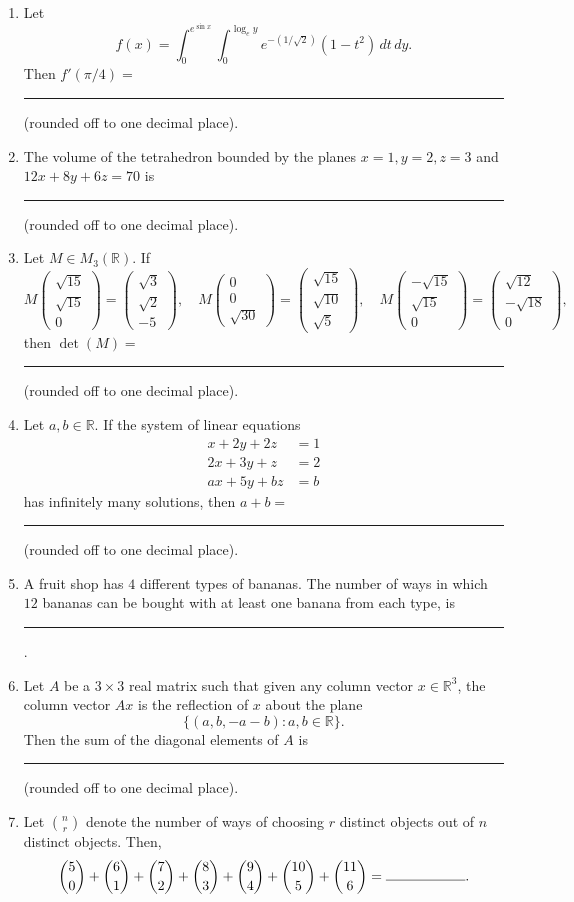 \begin{enumerate}
\item Let
\[f(x)=\int_0^{e^{\sin x}}\int_0^{\log_e y} e^{-(1/\sqrt2)}(1-t^2)\,dt\,dy.\]
Then $f'(\pi/4)=$ \rule{2cm}{0.4pt} (rounded off to one decimal place).
\item The volume of the tetrahedron bounded by the planes $x=1,y=2,z=3$ and $12x+8y+6z=70$ is \rule{2cm}{0.4pt} (rounded off to one decimal place).
\item Let $M\in M_3(\mathbb R)$. If
\[M\begin{pmatrix}\sqrt{15}\\\sqrt{15}\\0\end{pmatrix}=\begin{pmatrix}\sqrt3\\\sqrt2\\-5\end{pmatrix},\quad
M\begin{pmatrix}0\\0\\\sqrt{30}\end{pmatrix}=\begin{pmatrix}\sqrt{15}\\\sqrt{10}\\\sqrt5\end{pmatrix},\quad
M\begin{pmatrix}-\sqrt{15}\\\sqrt{15}\\0\end{pmatrix}=\begin{pmatrix}\sqrt{12}\\-\sqrt{18}\\0\end{pmatrix},\]
then $\det(M)=$ \rule{2cm}{0.4pt} (rounded off to one decimal place).
\item Let $a,b\in\mathbb R$. If the system of linear equations
\[\begin{aligned}
x+2y+2z&=1\\
2x+3y+z&=2\\
ax+5y+bz&=b
\end{aligned}\]
has infinitely many solutions, then $a+b=$ \rule{2cm}{0.4pt} (rounded off to one decimal place).
\item A fruit shop has $4$ different types of bananas. The number of ways in which $12$ bananas can be bought with at least one banana from each type, is \rule{2cm}{0.4pt}.
\item Let $A$ be a $3\times3$ real matrix such that given any column vector $x\in\mathbb R^3$, the column vector $Ax$ is the reflection of $x$ about the plane
\[\{(a,b,-a-b):a,b\in\mathbb R\}.\]
Then the sum of the diagonal elements of $A$ is \rule{2cm}{0.4pt} (rounded off to one decimal place).
\item Let $\binom nr$ denote the number of ways of choosing $r$ distinct objects out of $n$ distinct objects. Then,
\[\binom50+\binom61+\binom72+\binom83+\binom94+\binom{10}5+\binom{11}6=\rule{2cm}{0.4pt}.\]
\end{enumerate}
